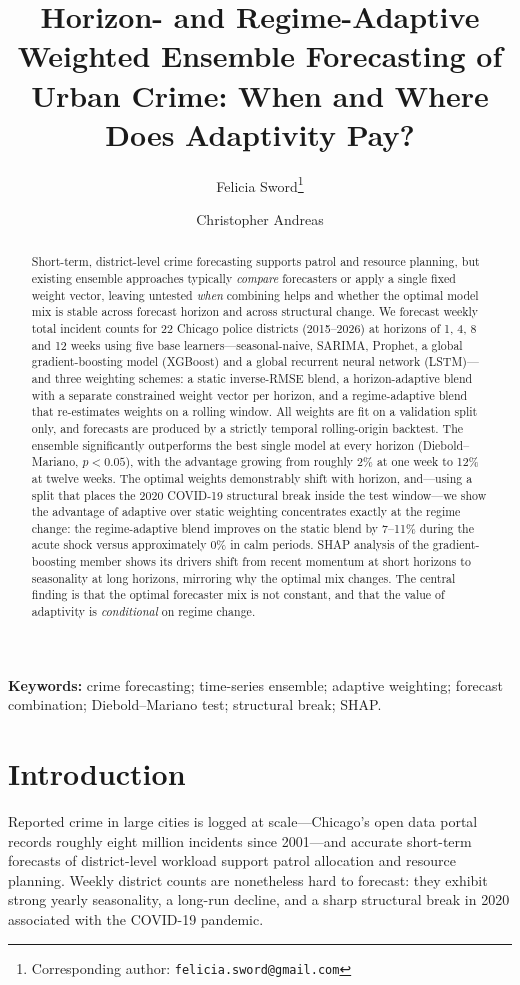 \documentclass[11pt]{article}
\title{Horizon- and Regime-Adaptive Weighted Ensemble Forecasting of Urban Crime:
When and Where Does Adaptivity Pay?}
\author[1]{Felicia Sword\thanks{Corresponding author: \texttt{felicia.sword@gmail.com}}}
\author[1]{Christopher Andreas}
\affil[1]{\small Department of [TODO], [Institution], [City], [Country]}
\date{}
\begin{document}
\maketitle

\begin{abstract}
Short-term, district-level crime forecasting supports patrol and resource planning, but
existing ensemble approaches typically \emph{compare} forecasters or apply a single fixed
weight vector, leaving untested \emph{when} combining helps and whether the optimal model
mix is stable across forecast horizon and across structural change. We forecast weekly total
incident counts for 22 Chicago police districts (2015--2026) at horizons of 1, 4, 8 and 12
weeks using five base learners---seasonal-naive, SARIMA, Prophet, a global gradient-boosting
model (XGBoost) and a global recurrent neural network (LSTM)---and three weighting schemes:
a static inverse-RMSE blend, a horizon-adaptive blend with a separate constrained weight
vector per horizon, and a regime-adaptive blend that re-estimates weights on a rolling
window. All weights are fit on a validation split only, and forecasts are produced by a
strictly temporal rolling-origin backtest. The ensemble significantly outperforms the best
single model at every horizon (Diebold--Mariano, $p<0.05$), with the advantage growing from
roughly 2\% at one week to 12\% at twelve weeks. The optimal weights demonstrably shift with
horizon, and---using a split that places the 2020 COVID-19 structural break inside the test
window---we show the advantage of adaptive over static weighting concentrates exactly at the
regime change: the regime-adaptive blend improves on the static blend by 7--11\% during the
acute shock versus approximately 0\% in calm periods. SHAP analysis of the gradient-boosting
member shows its drivers shift from recent momentum at short horizons to seasonality at long
horizons, mirroring why the optimal mix changes. The central finding is that the optimal
forecaster mix is not constant, and that the value of adaptivity is \emph{conditional} on
regime change.
\end{abstract}

\noindent\textbf{Keywords:} crime forecasting; time-series ensemble; adaptive weighting;
forecast combination; Diebold--Mariano test; structural break; SHAP.

\section{Introduction}
Reported crime in large cities is logged at scale---Chicago's open data portal records
roughly eight million incidents since 2001---and accurate short-term forecasts of district-level
workload support patrol allocation and resource planning. Weekly district counts are nonetheless
hard to forecast: they exhibit strong yearly seasonality, a long-run decline, and a sharp
structural break in 2020 associated with the COVID-19 pandemic.
\end{document}
